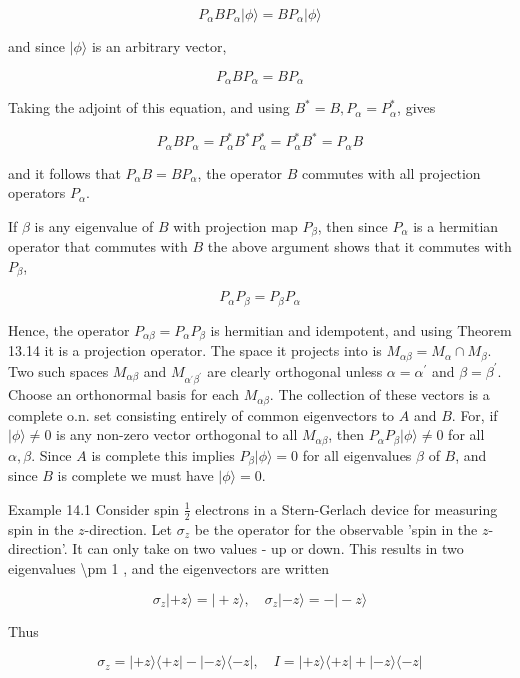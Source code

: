 \documentclass[10pt]{article}
\begin{document}
$$
P_{\alpha} B P_{\alpha}|\phi\rangle=B P_{\alpha}|\phi\rangle
$$

and since $|\phi\rangle$ is an arbitrary vector,

$$
P_{\alpha} B P_{\alpha}=B P_{\alpha}
$$

Taking the adjoint of this equation, and using $B^{*}=B, P_{\alpha}=P_{\alpha}^{*}$, gives

$$
P_{\alpha} B P_{\alpha}=P_{\alpha}^{*} B^{*} P_{\alpha}^{*}=P_{\alpha}^{*} B^{*}=P_{\alpha} B
$$

and it follows that $P_{\alpha} B=B P_{\alpha}$, the operator $B$ commutes with all projection operators $P_{\alpha}$.

If $\beta$ is any eigenvalue of $B$ with projection map $P_{\beta}$, then since $P_{\alpha}$ is a hermitian operator that commutes with $B$ the above argument shows that it commutes with $P_{\beta}$,

$$
P_{\alpha} P_{\beta}=P_{\beta} P_{\alpha}
$$

Hence, the operator $P_{\alpha \beta}=P_{\alpha} P_{\beta}$ is hermitian and idempotent, and using Theorem 13.14 it is a projection operator. The space it projects into is $M_{\alpha \beta}=M_{\alpha} \cap M_{\beta}$. Two such spaces $M_{\alpha \beta}$ and $M_{\alpha^{\prime} \beta^{\prime}}$ are clearly orthogonal unless $\alpha=\alpha^{\prime}$ and $\beta=\beta^{\prime}$. Choose an orthonormal basis for each $M_{\alpha \beta}$. The collection of these vectors is a complete o.n. set consisting entirely of common eigenvectors to $A$ and $B$. For, if $|\phi\rangle \neq 0$ is any non-zero vector orthogonal to all $M_{\alpha \beta}$, then $P_{\alpha} P_{\beta}|\phi\rangle \neq 0$ for all $\alpha, \beta$. Since $A$ is complete this implies $P_{\beta}|\phi\rangle=0$ for all eigenvalues $\beta$ of $B$, and since $B$ is complete we must have $|\phi\rangle=0$.

Example 14.1 Consider spin $\frac{1}{2}$ electrons in a Stern-Gerlach device for measuring spin in the $z$-direction. Let $\sigma_{z}$ be the operator for the observable 'spin in the $z$-direction'. It can only take on two values - up or down. This results in two eigenvalues \textbackslash pm 1 , and the eigenvectors are written

$$
\sigma_{z}|+z\rangle=|+z\rangle, \quad \sigma_{z}|-z\rangle=-|-z\rangle
$$

Thus

$$
\sigma_{z}=|+z\rangle\langle+z|-|-z\rangle\langle-z|, \quad I=|+z\rangle\langle+z|+|-z\rangle\langle-z|
$$
\end{document}
